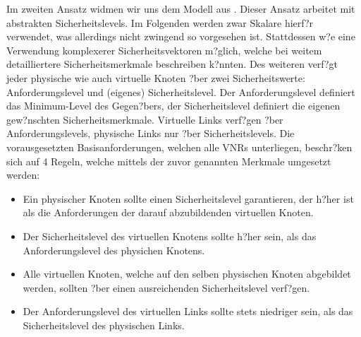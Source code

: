 \documentclass{lni}
\begin{document}
Im zweiten Ansatz widmen wir uns dem Modell aus \cite{algo2}. Dieser Ansatz arbeitet mit abstrakten Sicherheitslevels. Im Folgenden werden zwar Skalare hierf?r verwendet, was allerdings nicht zwingend so vorgesehen ist. Stattdessen w?e eine Verwendung komplexerer Sicherheitsvektoren m?glich, welche bei weitem detailliertere Sicherheitsmerkmale  beschreiben k?nnten. Des weiteren verf?gt jeder physische wie auch virtuelle Knoten ?ber zwei Sicherheitswerte: Anforderungslevel und (eigenes) Sicherheitslevel. Der Anforderungslevel definiert das Minimum-Level des Gegen?bers, der Sicherheitslevel definiert die eigenen gew?nschten Sicherheitsmerkmale. Virtuelle Links verf?gen ?ber Anforderungslevels, physische Links nur ?ber Sicherheitslevels. Die vorausgesetzten Basisanforderungen, welchen alle VNRs unterliegen, beschr?ken sich auf 4 Regeln, welche mittels der zuvor genannten Merkmale umgesetzt werden:
\begin{itemize}
\item Ein physischer Knoten sollte einen Sicherheitslevel garantieren, 
   der h?her ist als die Anforderungen der darauf abzubildenden
   virtuellen Knoten.

\item Der Sicherheitslevel des virtuellen Knotens sollte h?her sein, 
   als das Anforderungslevel des physichen Knotens.

\item Alle virtuellen Knoten, welche auf den selben physischen Knoten
   abgebildet werden, sollten ?ber einen ausreichenden Sicherheitslevel
   verf?gen.

\item Der Anforderungslevel des virtuellen Links sollte stets niedriger
   sein, als das Sicherheitslevel des physischen Links.
\end{itemize}%
\end{document}
